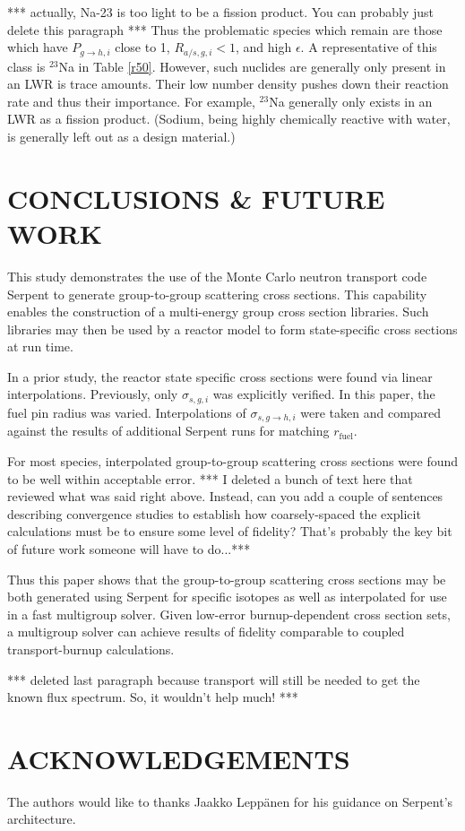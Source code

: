 \documentclass{physor2012}
\newcommand{\superscript}[1]{\ensuremath{^{\textrm{#1}}}}
\newcommand{\nuc}[2]{\superscript{#2}{#1}}
\begin{document}
*** actually, Na-23 is too light to be a fission product.  You can probably just delete this paragraph ***
Thus the problematic species which remain are those which have $P_{g\to h,i}$ close
to 1, $R_{a/s,g,i} < 1$, and high $\epsilon$.  A representative of this class is
\nuc{Na}{23} in Table \ref{r50}.  However, such nuclides are generally only present
in an LWR is trace amounts.  Their low number density pushes down their reaction rate
and thus their importance.  For example, \nuc{Na}{23} generally only exists in an
LWR as a fission product.  (Sodium, being highly chemically reactive with water, is
generally left out as a design material.)


\section{CONCLUSIONS \& FUTURE WORK}
\label{sec:conclusions}

This study demonstrates the use of the Monte Carlo neutron transport code Serpent to generate group-to-group scattering
cross sections.  This capability enables the construction of a multi-energy
group cross section libraries.  Such libraries may then be used by a reactor
model to form state-specific cross sections at run time.

In a prior study, the reactor state specific cross sections were found
via linear interpolations.  Previously, only $\sigma_{s,g,i}$ was
explicitly verified.  In this paper, the fuel pin radius was varied.
Interpolations of $\sigma_{s,g\to h,i}$ were taken and compared against
the results of additional Serpent runs for matching $r_{\mbox{fuel}}$.

For most species, interpolated group-to-group scattering cross sections
were found to be well within acceptable error.  *** I deleted a bunch of text here that reviewed what was said right above.  Instead, can you add a couple of sentences describing convergence studies to establish how coarsely-spaced the explicit calculations must be to ensure some level of fidelity?  That's probably the key bit of future work someone will have to do...***

Thus this paper shows that the group-to-group scattering cross sections may be
both generated using Serpent for specific isotopes as well as interpolated for use in a fast multigroup solver.  Given low-error burnup-dependent cross section sets, a multigroup solver can achieve results of fidelity comparable to coupled transport-burnup calculations.

*** deleted last paragraph because transport will still be needed to get the known flux spectrum.  So, it wouldn't help much! ***


\section*{ACKNOWLEDGEMENTS}
The authors would like to thanks Jaakko Lepp\"{a}nen for his guidance
on Serpent's architecture.


%
\setlength{\baselineskip}{12pt}


\end{document}

